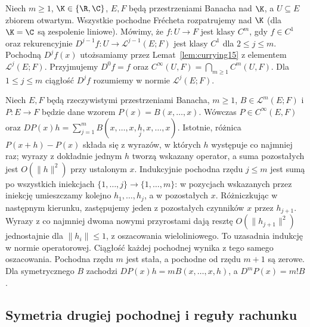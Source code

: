 \begin{definicja}
\label{def:ck15}
Niech $m\ge1$, $\K\in\{\R,\C\}$, $E,F$ będą przestrzeniami Banacha nad $\K$, a $U\subseteq E$ zbiorem otwartym. Wszystkie pochodne Frécheta rozpatrujemy nad $\K$ (dla $\K=\C$ są zespolenie liniowe). Mówimy, że $f:U\to F$ jest klasy $C^m$, gdy $f\in C^1$ oraz rekurencyjnie $D^{j-1}f:U\to\mathcal L^{j-1}(E;F)$ jest klasy $C^1$ dla $2\le j\le m$. Pochodną $D^jf(x)$ utożsamiamy przez Lemat~\ref{lem:currying15} z elementem $\mathcal L^j(E;F)$. Przyjmujemy $D^0f=f$ oraz $C^\infty(U,F)=\bigcap_{m\ge1}C^m(U,F)$. Dla $1\le j\le m$ ciągłość $D^jf$ rozumiemy w normie $\mathcal L^j(E;F)$.
\end{definicja}

\begin{przyklad}
\label{ex:multi-poly15}
Niech $E,F$ będą rzeczywistymi przestrzeniami Banacha, $m\ge1$, $B\in\mathcal L^m(E;F)$ i $P:E\to F$ będzie dane wzorem $P(x)=B(x,\ldots,x)$. Wówczas $P\in C^\infty(E,F)$ oraz
$DP(x)h=\sum_{j=1}^m B(x,\ldots,x,\underset{j}{h},x,\ldots,x)$.
Istotnie, różnica $P(x+h)-P(x)$ składa się z wyrazów, w których $h$ występuje co najmniej raz; wyrazy z dokładnie jednym $h$ tworzą wskazany operator, a suma pozostałych jest $O(\|h\|^2)$ przy ustalonym $x$. Indukcyjnie pochodna rzędu $j\le m$ jest sumą po wszystkich iniekcjach $\{1,\ldots,j\}\to\{1,\ldots,m\}$: w pozycjach wskazanych przez iniekcję umieszczamy kolejno $h_1,\ldots,h_j$, a w pozostałych $x$. Różniczkując w następnym kierunku, zastępujemy jeden z pozostałych czynników $x$ przez $h_{j+1}$. Wyrazy z co najmniej dwoma nowymi przyrostami dają resztę $O(\|h_{j+1}\|^2)$ jednostajnie dla $\|h_i\|\le1$, z oszacowania wieloliniowego. To uzasadnia indukcję w normie operatorowej. Ciągłość każdej pochodnej wynika z tego samego oszacowania. Pochodna rzędu $m$ jest stała, a pochodne od rzędu $m+1$ są zerowe. Dla symetrycznego $B$ zachodzi $DP(x)h=mB(x,\ldots,x,h)$, a $D^mP(x)=m!B$.
\end{przyklad}

\subsection{Symetria drugiej pochodnej i reguły rachunku}


